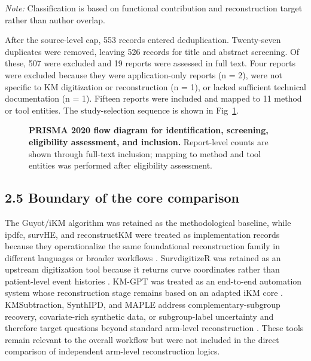 \documentclass[12pt,letterpaper]{article}
\newif\ifshowfigures
\begin{document}
\emph{Note:} Classification is based on functional contribution and reconstruction target rather than author overlap.

After the source-level cap, 553 records entered deduplication. Twenty-seven duplicates were removed, leaving 526 records for title and abstract screening. Of these, 507 were excluded and 19 reports were assessed in full text. Four reports were excluded because they were application-only reports (n = 2), were not specific to KM digitization or reconstruction (n = 1), or lacked sufficient technical documentation (n = 1). Fifteen reports were included and mapped to 11 method or tool entities. The study-selection sequence is shown in Fig~\ref{fig:prisma}.

\begin{figure}[!ht]
\centering
\ifshowfigures
\fbox{\parbox[c][2.0in][c]{0.92\textwidth}{\centering\textbf{Draft placeholder: Fig 1}\\[4pt]Replace this box with the final PRISMA 2020 flow diagram after the screening ledger is audited.}}
\fi
\caption{\textbf{PRISMA 2020 flow diagram for identification, screening, eligibility assessment, and inclusion.} Report-level counts are shown through full-text inclusion; mapping to method and tool entities was performed after eligibility assessment.}
\label{fig:prisma}
\end{figure}

\subsection*{2.5 Boundary of the core comparison}

The Guyot/iKM algorithm was retained as the methodological baseline, while ipdfc, survHE, and reconstructKM were treated as implementation records because they operationalize the same foundational reconstruction family in different languages or broader workflows \cite{guyot2012,wei2017,baio2020,reconstructkm2025}. SurvdigitizeR was retained as an upstream digitization tool because it returns curve coordinates rather than patient-level event histories \cite{zhang2024}. KM-GPT was treated as an end-to-end automation system whose reconstruction stage remains based on an adapted iKM core \cite{kmgpt2025}. KMSubtraction, SynthIPD, and MAPLE address complementary-subgroup recovery, covariate-rich synthetic data, or subgroup-label uncertainty and therefore target questions beyond standard arm-level reconstruction \cite{zhao2022,synthipd2026,resolve2026}. These tools remain relevant to the overall workflow but were not included in the direct comparison of independent arm-level reconstruction logics.
\end{document}
